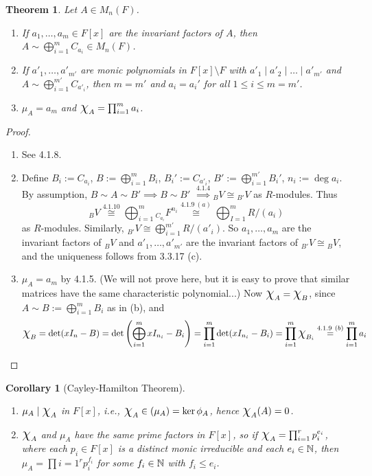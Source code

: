 \documentclass[11pt]{book}
\newcounter{counter}
\newtheorem{theorem}[counter]{Theorem}   \newtheorem*{theorem*}{Theorem}   \newtheorem{lemma}[counter]{Lemma}   \newtheorem{corollary}[counter]{Corollary}
\theoremstyle{definition}   \newtheorem{defn}[counter]{Definition} %
\newcommand{\bs}{\setminus}   \newcommand{\A}{\mathcal{A}}   \newcommand{\sy}{\textnormal{Syl}}   \newcommand{\size}[1]{\left| #1 \right|}
\newcommand{\Chi}{\mbox{\Large $\chi$}}
\newcommand{\vs}{\vspace{8pt}}
\numberwithin{counter}{chapter}
\begin{document}
\vs

\begin{theorem}
Let $A \in M_n(F)$.
\begin{enumerate}
\item[(a)] If $a_1,\dots,a_m \in F[x]$ are the invariant factors of $A$, then $A \sim \bigoplus_{i=1}^m C_{a_i} \in M_n(F)$.
\item[(b)] If $a'_1,\dots,a'_{m'}$ are monic polynomials in $F[x]\bs F$ with $a'_1\mid a'_2 \mid \dots \mid a'_{m'}$ and $A \sim \bigoplus_{i=1}^{m'} C_{a'_i}$, then $m = m'$ and $a_i = a_i'$ for all $1 \leq i \leq m = m'$.
\item[(c)] $\mu_A = a_m$ and $\Chi_A = \prod_{i=1}^m a_i$.
\end{enumerate}
\end{theorem}

\begin{proof}\
\begin{enumerate}
\item[(a)] See 4.1.8.
\item[(b)] Define $B_i := C_{a_i}$, $B := \bigoplus_{i=1}^m B_i$, $B_i' := C_{a'_i}$, $B' := \bigoplus_{i=1}^{m'} B_i'$, $n_i := \deg a_i$. By assumption, $B \sim A \sim B' \implies B \sim B'$ $\overset{4.1.4}{\implies} {_BV} \cong {_{B'}V}$ as $R$-modules. Thus
	\[{_BV} \overset{4.1.10}{\cong} \bigoplus_{i=1}^m {_{C_{a_i}}}F^{n_i} \overset{4.1.9 \ (a)}{\cong} \bigoplus_{I=1}^m R/(a_i) \]
as $R$-modules. Similarly, ${_{B'}V} \cong \bigoplus_{i=1}^{m'} R/(a'_i)$. So $a_1,\dots,a_m$ are the invariant factors of ${_BV}$ and $a'_1,\dots,a'_{m'}$ are the invariant factors of ${_{B'}V} \cong {_BV}$, and the uniqueness follows from 3.3.17 (c).

\item[(c)] $\mu_A = a_m$ by 4.1.5.  (We will not prove here, but it is easy to prove that similar matrices have the same characteristic polynomial...) Now $\Chi_A = \Chi_B$, since $A \sim B := \bigoplus_{i=1}^m B_i$ as in (b), and
	\[\Chi_B = \det(xI_n-B) = \det \left(\bigoplus_{i=1}^m xI_{n_i} - B_i\right) = \prod_{i=1}^m \det(xI_{n_i} - B_i) = \prod_{i=1}^m \Chi_{B_i} \overset{4.1.9\ (b)}{=} \prod_{i=1}^m a_i \]
\end{enumerate}
\end{proof}

\vs

\begin{corollary}[Cayley-Hamilton Theorem]\
\begin{enumerate}
\item[(a)] $\mu_A \mid \Chi_A$ in $F[x]$, i.e., $\Chi_A \in (\mu_A) = \ker \phi_A$, hence $\Chi_A(A) = 0$.
\item[(b)] $\Chi_A$ and $\mu_A$ have the same prime factors in $F[x]$, so if $\Chi_A = \prod_{i=1}^r p_i^{e_i}$, where each $p_i \in F[x]$ is a distinct monic irreducible and each $e_i \in \operatorname{\mathbb{N}}$, then $\mu_A = \prod{i=1}^r p_i^{f_i}$ for some $f_i \in \operatorname{\mathbb{N}}$ with $f_i \leq e_i$.
\end{enumerate}
\end{corollary}
\end{document}
